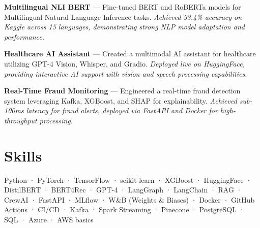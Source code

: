 \documentclass[10.5pt,letterpaper]{article}
\begin{document}
\textbf{Multilingual NLI BERT} — Fine-tuned BERT and RoBERTa models for Multilingual Natural Language Inference tasks. \textit{Achieved 93.4\% accuracy on Kaggle across 15 languages, demonstrating strong NLP model adaptation and performance.}

\textbf{Healthcare AI Assistant} — Created a multimodal AI assistant for healthcare utilizing GPT-4 Vision, Whisper, and Gradio. \textit{Deployed live on HuggingFace, providing interactive AI support with vision and speech processing capabilities.}

\textbf{Real-Time Fraud Monitoring} — Engineered a real-time fraud detection system leveraging Kafka, XGBoost, and SHAP for explainability. \textit{Achieved sub-100ms latency for fraud alerts, deployed via FastAPI and Docker for high-throughput processing.}

\section{Skills}
Python · PyTorch · TensorFlow · scikit-learn · XGBoost · HuggingFace · DistilBERT · BERT4Rec · GPT-4 · LangGraph · LangChain · RAG · CrewAI · FastAPI · MLflow · W\&B (Weights \& Biases) · Docker · GitHub Actions · CI/CD · Kafka · Spark Streaming · Pinecone · PostgreSQL · SQL · Azure · AWS basics
\end{document}

